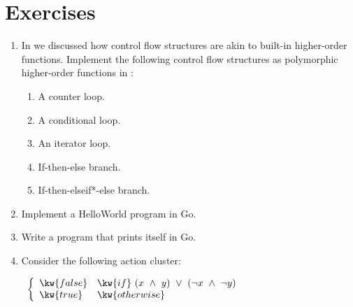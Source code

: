 \section*{Exercises}

\renewcommand{\theenumi}{\bf\arabic{enumi}}

\begin{enumerate}

\item {} In  we discussed how
control flow structures are akin to built-in higher-order functions. Implement
the following control flow structures as polymorphic higher-order functions in
\fun:

\begin{enumerate}

\item A counter loop.

\item A conditional loop.

\item An iterator loop.

\item If-then-else branch.

\item If-then-elseif*-else branch.

\end{enumerate}

\item Implement a HelloWorld program in Go.

\item Write a program that prints itself in Go.

\item Consider the following action cluster:

\begin{codebox}
\zi {}\ $\left\{
\begin{array}{ll}
\kw{false} & \kw{if}\ (x\ \wedge\ y)\ \vee\ (\neg x\ \wedge\ \neg y)\\
\kw{true} & \kw{otherwise}
\end{array}
\right.$
\end{codebox}


\end{enumerate}
